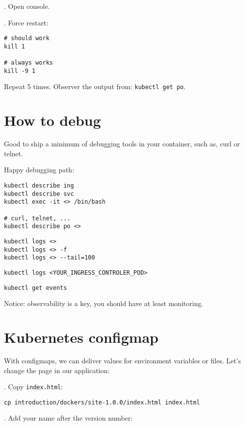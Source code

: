 \documentclass[12pt, letterpaper]{article}
\begin{document}
. Open console.

. Force restart:

\begin{verbatim}
# should work
kill 1

# always works
kill -9 1
\end{verbatim}

Repeat 5 times. Observer the output from: \verb|kubectl get po|.

%
%
%
\section{How to debug}

Good to ship a minimum of debugging tools in your container, such as, curl or telnet.

Happy debugging path:

\begin{verbatim}
kubectl describe ing
kubectl describe svc
kubectl exec -it <> /bin/bash

# curl, telnet, ...
kubectl describe po <>
\end{verbatim}

\begin{verbatim}
kubectl logs <>
kubectl logs <> -f
kubectl logs <> --tail=100
\end{verbatim}

\begin{verbatim}
kubectl logs <YOUR_INGRESS_CONTROLER_POD>
\end{verbatim}

\begin{verbatim}
kubectl get events
\end{verbatim}

\bigskip
Notice: observability is a key, you should have at least monitoring.
%
%
%
\pagebreak
\section{Kubernetes configmap}

With configmaps, we can deliver values for environment variables or files. Let's change the page in our application:

. Copy \verb|index.html|:

\begin{verbatim}
cp introduction/dockers/site-1.0.0/index.html index.html
\end{verbatim}

. Add your name after the version number:
\end{document}
